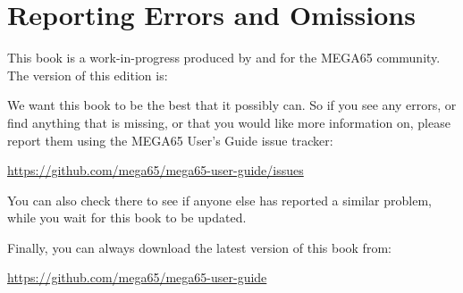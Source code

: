 \chapter*{Reporting Errors and Omissions}

This book is a work-in-progress produced by and for the MEGA65 community.
The version of this edition is:



We want this book to be the best that it possibly can. So if you see any errors,
or find anything that is missing, or that you would like more information on,
please report them using the MEGA65 User's Guide issue tracker:

\url{https://github.com/mega65/mega65-user-guide/issues}

You can also check there to see if anyone else has reported a similar problem,
while you wait for this book to be updated.

Finally, you can always download the latest version of this book from:

\url{https://github.com/mega65/mega65-user-guide}


